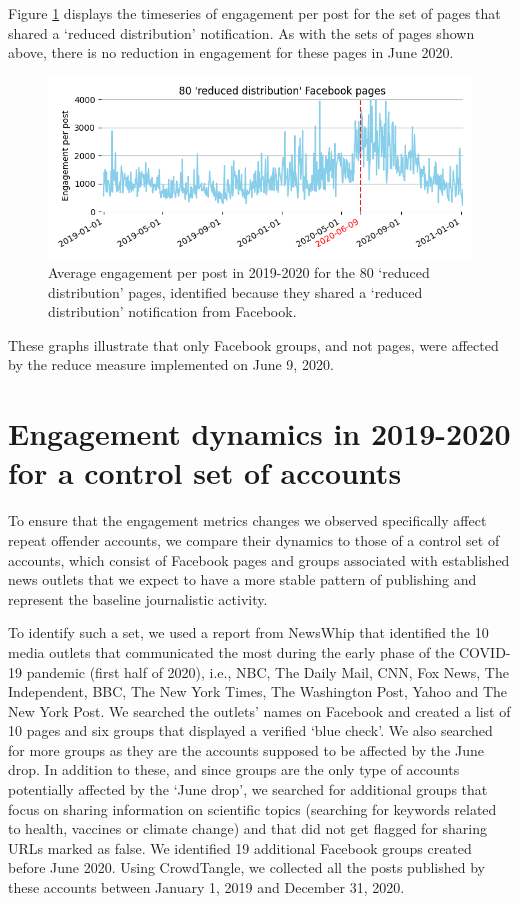 \documentclass[review]{elsarticle}
\begin{document}
{{Figure \ref{engagement_groups_and_pages_reduce} displays the timeseries of engagement per post for the set of pages that shared a `reduced distribution' notification.
As with the sets of pages shown above, there is no reduction in engagement for these pages in June 2020.

\begin{figure}[!h]
\centering
\includegraphics[scale=0.5]{./../figure/supplementary_engagement_pages_reduce.png}
\caption{
Average engagement per post in 2019-2020 for the 80 `reduced distribution' pages, identified because they shared a `reduced distribution' notification from Facebook.
}
\label{engagement_groups_and_pages_reduce}
\end{figure}

These graphs illustrate that only Facebook groups, and not pages, were affected by the reduce measure implemented on June 9, 2020.

\section*{Engagement dynamics in 2019-2020 for a control set of accounts}

To ensure that the engagement metrics changes we observed specifically affect repeat offender accounts, we compare their dynamics to those of a control set of accounts, which consist of Facebook pages and groups associated with established news outlets that we expect to have a more stable pattern of publishing and represent the baseline journalistic activity. 

To identify such a set, we used a report from NewsWhip \citep{NewsWhipReport} that identified the 10 media outlets that communicated the most during the early phase of the COVID-19 pandemic (first half of 2020), i.e., NBC, The Daily Mail, CNN, Fox News, The Independent, BBC, The New York Times, The Washington Post, Yahoo and The New York Post.
We searched the outlets' names on Facebook and created a list of 10 pages and six groups that displayed a verified `blue check'.
We also searched for more groups as they are the accounts supposed to be affected by the June drop.
In addition to these, and since  groups are the only type of accounts potentially affected by the `June drop', we searched for additional groups that focus on sharing information on scientific topics (searching for keywords related to health, vaccines or climate change) and that did not get flagged for sharing URLs marked as false.
We identified 19 additional Facebook groups created before June 2020.
Using CrowdTangle, we collected all the posts published by these accounts between January 1, 2019 and December 31, 2020.

}}
\end{document}

